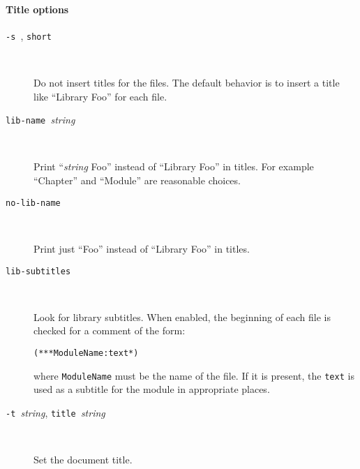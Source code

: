 \paragraph{Title options}
\begin{description}
\item[\texttt{-s }, \texttt{\mm{}short}] ~\par
  
  Do not insert titles for the files. The default behavior is to
  insert a title like ``Library Foo'' for each file.

\item[\texttt{\mm{}lib-name }\textit{string}] ~\par

  Print ``\textit{string} Foo'' instead of ``Library Foo'' in titles.
  For example ``Chapter'' and ``Module'' are reasonable choices.

\item[\texttt{\mm{}no-lib-name}] ~\par

  Print just ``Foo'' instead of ``Library Foo'' in titles.

\item[\texttt{\mm{}lib-subtitles}] ~\par

  Look for library subtitles.  When enabled, the beginning of each
  file is checked for a comment of the form:
\begin{alltt}
(** * ModuleName : text *)
\end{alltt}
  where \texttt{ModuleName} must be the name of the file.  If it is
  present, the \texttt{text} is used as a subtitle for the module in
  appropriate places.

\item[\texttt{-t }\textit{string}, 
      \texttt{\mm{}title }\textit{string}] ~\par
  
  Set the document title.      

\end{description}

